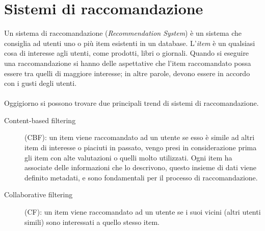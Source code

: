 \newpage

\section{Sistemi di raccomandazione}
Un sistema di raccomandazione (\textit{Recommendation System}) è un sistema che consiglia ad utenti uno o più item esistenti 
in un database. L'\textit{item} è un qualsiasi cosa di interesse agli utenti, come prodotti, libri o giornali. Quando si eseguire
una raccomandazione si hanno delle aspettative che l'item raccomandato possa essere tra quelli di maggiore interesse; in altre parole, 
devono essere in accordo con i gusti degli utenti. 
\ \\
\ \\
Oggigiorno si possono trovare due principali trend di sistemi di raccomandazione.
\begin{description}
	\item[Content-based filtering](CBF): un item viene raccomandato ad un utente se esso è simile ad altri item di interesse o piaciuti
	in passato, vengo presi in considerazione prima gli item con alte valutazioni o quelli molto utilizzati. Ogni item ha associate
	delle informazioni che lo descrivono, questo insieme di dati viene definito metadati, e sono fondamentali per il processo di 
	raccomandazione. 
	\item[Collaborative filtering](CF): un item viene raccomandato ad un utente se i suoi vicini (altri utenti simili) sono 
	interessati a quello stesso item.   
\end{description}

